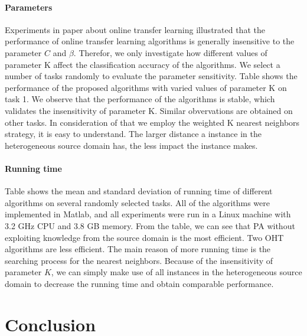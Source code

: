 \documentclass[twocolumn]{article}
\begin{document}
\paragraph{Parameters}
Experiments in paper about online transfer learning illustrated that the performance of online transfer learning algorithms is generally insensitive to the parameter $C$ and $\beta$.
Therefor, we only investigate how different values of parameter K affect the classification accuracy of the algorithms.
We select a number of tasks randomly to evaluate the parameter sensitivity.
Table shows the performance of the proposed algorithms with varied values of parameter K on task 1.
We observe that the performance of the algorithms is stable, which validates the insensitivity of parameter K.
Similar obvervations are obtained on other tasks.
In consideration of that we employ the weighted K nearest neighbors strategy, it is easy to understand.
The larger distance a instance in the heterogeneous source domain has, the less impact the instance makes.

\paragraph{Running time}
Table shows the mean and standard deviation of running time of different algorithms on several randomly selected tasks.
All of the algorithms were implemented in Matlab, and all experiments were run in a Linux machine with 3.2 GHz CPU and 3.8 GB memory.
From the table, we can see that PA without exploiting knowledge from the source domain is the most efficient.
Two OHT algorithms are less efficient.
The main reason of more running time is the searching process for the nearest neighbors.
Because of the insensitivity of parameter $K$, we can simply make use of all instances in the heterogeneous source domain to decrease the running time and obtain comparable performance.

\section{Conclusion}
\end{document}
